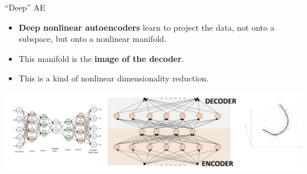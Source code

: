 \documentclass[serif, aspectratio=169]{beamer}
\begin{document}
\begin{frame}{``Deep'' AE}
    \begin{itemize}
        \item \textbf{Deep nonlinear autoencoders} learn to project the data, not onto a subspace, but onto a nonlinear \textcolor{deepgreen}{manifold}.
        \vspace{0.1cm}
        
        \item This manifold is the \textbf{image of the decoder}.
        \vspace{0.1cm}
        
        \item This is a kind of \textcolor{deepgreen}{nonlinear dimensionality reduction}.
    \end{itemize}
    
    
    \begin{center}
        \includegraphics[width=\textwidth]{pic/Deep AE1.png} 
    \end{center}
    
\end{frame}
\end{document}
